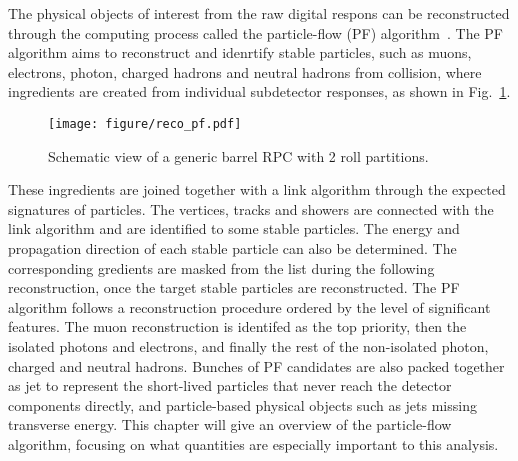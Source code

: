 The physical objects of interest from the raw digital respons can be reconstructed through the computing process called the particle-flow (PF) algorithm~\cite{CMS:particle_flow}.
The PF algorithm aims to reconstruct and idenrtify stable particles, such as muons, electrons, photon, charged hadrons and neutral hadrons from collision, where ingredients are created from individual subdetector responses, as shown in Fig.~\ref{fig:reco_pf}.
\begin{figure}[H]\centering
    \texttt{[image: figure/reco\_pf.pdf]}
    \caption{Schematic view of a generic barrel RPC with 2 roll partitions.}
    \label{fig:reco_pf}
\end{figure}

These ingredients are joined together with a link algorithm through the expected signatures of particles.
The vertices, tracks and showers are connected with the link algorithm and are identified to some stable particles.
The energy and propagation direction of each stable particle can also be determined.
The corresponding gredients are masked from the list during the following reconstruction, once the target stable particles are reconstructed.
The PF algorithm follows a reconstruction procedure ordered by the level of significant features.
The muon reconstruction is identifed as the top priority, then the isolated photons and electrons, and finally the rest of the non-isolated photon, charged and neutral hadrons.
Bunches of PF candidates are also packed together as jet to represent the short-lived particles that never reach the detector components directly, and particle-based physical objects such as jets missing transverse energy.
This chapter will give an overview of the particle-flow algorithm, focusing on what quantities are especially important to this analysis.


